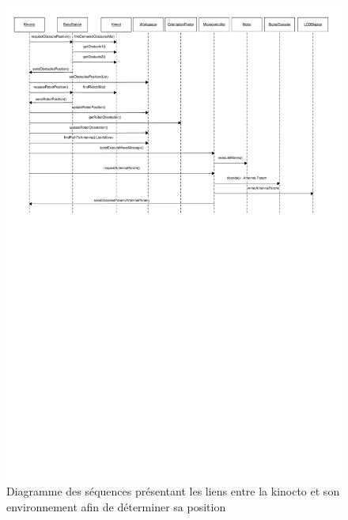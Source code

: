 \begin{figure}[htb]
\includegraphics[scale=0.9]{fig/diagrammes_sequence2.pdf}
\caption{Diagramme des séquences présentant les liens entre la kinocto et son environnement afin de déterminer sa position}
\label{diagSeq2Ite1}
\end{figure}
